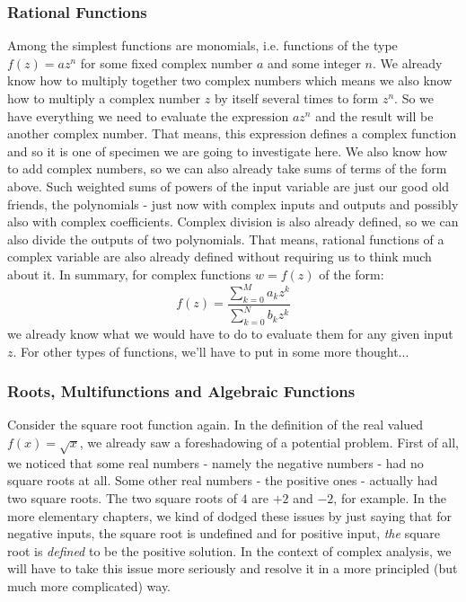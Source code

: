 \subsubsection{Rational Functions}
Among the simplest functions are monomials, i.e. functions of the type $f(z) = a z^n$ for some fixed complex number $a$ and some integer $n$. We already know how to multiply together two complex numbers which means we also know how to multiply a complex number $z$ by itself several times to form $z^n$. So we have everything we need to evaluate the expression $a z^n$ and the result will be another complex number. That means, this expression defines a complex function and so it is one of specimen we are going to investigate here. We also know how to add complex numbers, so we can also already take sums of terms of the form above. Such weighted sums of powers of the input variable are just our good old friends, the polynomials - just now with complex inputs and outputs and possibly also with complex coefficients. Complex division is also already defined, so we can also divide the outputs of two polynomials. That means, rational functions of a complex variable are also already defined without requiring us to think much about it. In summary, for complex functions $w = f(z)$ of the form:
\begin{equation}
f(z) = \frac{\sum_{k=0}^{M} a_k z^k}{\sum_{k=0}^{N} b_k z^k}
\end{equation}
we already know what we would have to do to evaluate them for any given input $z$. For other types of functions, we'll have to put in some more thought...




\subsubsection{Roots, Multifunctions and Algebraic Functions}
Consider the square root function again. In the definition of the real valued $f(x) = \sqrt{x}$, we already saw a foreshadowing of a potential problem. First of all, we noticed that some real numbers - namely the negative numbers - had no square roots at all. Some other real numbers - the positive ones - actually had two square roots. The two square roots of $4$ are $+2$ and $-2$, for example. In the more elementary chapters, we kind of dodged these issues by just saying that for negative inputs, the square root is undefined and for positive input, \emph{the} square root is \emph{defined} to be the positive solution. In the context of complex analysis, we will have to take this issue more seriously and resolve it in a more principled (but much more complicated) way.

